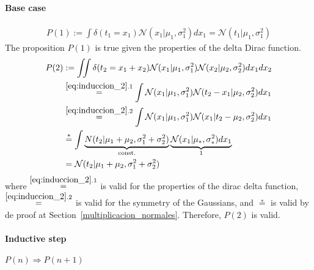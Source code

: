 \documentclass[article]{jss}
\newcommand{\N}{\mathcal{N}}
\begin{document}
\paragraph{Base case}
%
\begin{equation}
\begin{split}
 P(1) := \int \delta(t_1 = x_1) \N(x_1|\mu_1,\sigma_1^2) dx_1 = \N(t_1|\mu_1,\sigma_1^2)
\end{split}
\end{equation}
%
The proposition $P(1)$ is true given the properties of the delta Dirac function. 
%
\begin{equation}\label{eq:induccion_2}
\begin{split}
P(2) & := \iint \delta(t_2 = x_1 + x_2) \N(x_1|\mu_1, \sigma_1^2)\N(x_2|\mu_2, \sigma_2^2) dx_1dx_2 \\
 & \overset{\ref{eq:induccion_2}.1}{=} \int \N(x_1|\mu_1, \sigma_1^2) \N(t_2 - x_1|\mu_2, \sigma_2^2) dx_1   \\
 & \overset{\ref{eq:induccion_2}.2}{=} \int \N(x_1|\mu_1, \sigma_1^2) \N(x_1|t_2 - \mu_2, \sigma_2^2) dx_1 \\
 & \overset{*}{=} \int \underbrace{N(t_2|\mu_1+\mu_2,\sigma_1^2 + \sigma_2^2)}_{\text{const.}} \underbrace{\N(x_1|\mu_{*},\sigma_{*}^2) dx_1}_{1} \\
 & = \N(t_2|\mu_1+\mu_2,\sigma_1^2 + \sigma_2^2)
\end{split}
\end{equation}
where $\overset{\ref{eq:induccion_2}.1}{=}$ is valid for the properties of the dirac delta function, $\overset{\ref{eq:induccion_2}.2}{=}$ is valid for the symmetry of the Gaussians, and $\overset{*}{=}$ is valid by de proof at Section~\ref{multiplicacion_normales}. 
Therefore, $P(2)$ is valid. 

\paragraph{Inductive step} $P(n) \Rightarrow P(n+1)$
\end{document}
